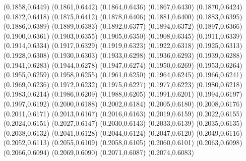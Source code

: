 \PST@Filltriangle(0.1858,0.6449)
\PST@Filltriangle(0.1861,0.6442)
\PST@Filltriangle(0.1864,0.6436)
\PST@Filltriangle(0.1867,0.6430)
\PST@Filltriangle(0.1870,0.6424)
\PST@Filltriangle(0.1872,0.6418)
\PST@Filltriangle(0.1875,0.6412)
\PST@Filltriangle(0.1878,0.6406)
\PST@Filltriangle(0.1881,0.6400)
\PST@Filltriangle(0.1883,0.6395)
\PST@Filltriangle(0.1886,0.6389)
\PST@Filltriangle(0.1889,0.6383)
\PST@Filltriangle(0.1892,0.6377)
\PST@Filltriangle(0.1894,0.6372)
\PST@Filltriangle(0.1897,0.6366)
\PST@Filltriangle(0.1900,0.6361)
\PST@Filltriangle(0.1903,0.6355)
\PST@Filltriangle(0.1905,0.6350)
\PST@Filltriangle(0.1908,0.6345)
\PST@Filltriangle(0.1911,0.6339)
\PST@Filltriangle(0.1914,0.6334)
\PST@Filltriangle(0.1917,0.6329)
\PST@Filltriangle(0.1919,0.6323)
\PST@Filltriangle(0.1922,0.6318)
\PST@Filltriangle(0.1925,0.6313)
\PST@Filltriangle(0.1928,0.6308)
\PST@Filltriangle(0.1930,0.6303)
\PST@Filltriangle(0.1933,0.6298)
\PST@Filltriangle(0.1936,0.6293)
\PST@Filltriangle(0.1939,0.6288)
\PST@Filltriangle(0.1941,0.6283)
\PST@Filltriangle(0.1944,0.6278)
\PST@Filltriangle(0.1947,0.6274)
\PST@Filltriangle(0.1950,0.6269)
\PST@Filltriangle(0.1953,0.6264)
\PST@Filltriangle(0.1955,0.6259)
\PST@Filltriangle(0.1958,0.6255)
\PST@Filltriangle(0.1961,0.6250)
\PST@Filltriangle(0.1964,0.6245)
\PST@Filltriangle(0.1966,0.6241)
\PST@Filltriangle(0.1969,0.6236)
\PST@Filltriangle(0.1972,0.6232)
\PST@Filltriangle(0.1975,0.6227)
\PST@Filltriangle(0.1977,0.6223)
\PST@Filltriangle(0.1980,0.6218)
\PST@Filltriangle(0.1983,0.6214)
\PST@Filltriangle(0.1986,0.6209)
\PST@Filltriangle(0.1988,0.6205)
\PST@Filltriangle(0.1991,0.6201)
\PST@Filltriangle(0.1994,0.6197)
\PST@Filltriangle(0.1997,0.6192)
\PST@Filltriangle(0.2000,0.6188)
\PST@Filltriangle(0.2002,0.6184)
\PST@Filltriangle(0.2005,0.6180)
\PST@Filltriangle(0.2008,0.6176)
\PST@Filltriangle(0.2011,0.6171)
\PST@Filltriangle(0.2013,0.6167)
\PST@Filltriangle(0.2016,0.6163)
\PST@Filltriangle(0.2019,0.6159)
\PST@Filltriangle(0.2022,0.6155)
\PST@Filltriangle(0.2024,0.6151)
\PST@Filltriangle(0.2027,0.6147)
\PST@Filltriangle(0.2030,0.6143)
\PST@Filltriangle(0.2033,0.6139)
\PST@Filltriangle(0.2035,0.6135)
\PST@Filltriangle(0.2038,0.6132)
\PST@Filltriangle(0.2041,0.6128)
\PST@Filltriangle(0.2044,0.6124)
\PST@Filltriangle(0.2047,0.6120)
\PST@Filltriangle(0.2049,0.6116)
\PST@Filltriangle(0.2052,0.6113)
\PST@Filltriangle(0.2055,0.6109)
\PST@Filltriangle(0.2058,0.6105)
\PST@Filltriangle(0.2060,0.6101)
\PST@Filltriangle(0.2063,0.6098)
\PST@Filltriangle(0.2066,0.6094)
\PST@Filltriangle(0.2069,0.6090)
\PST@Filltriangle(0.2071,0.6087)
\PST@Filltriangle(0.2074,0.6083)
